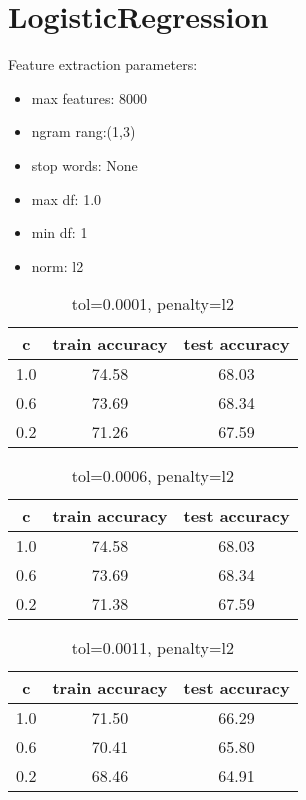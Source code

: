 \documentclass[a4paper,10pt]{article}
\begin{document}
\section{LogisticRegression}
\par Feature extraction parameters:
\begin{itemize}
\item max features: 8000
\item ngram rang:(1,3)
\item stop words: None
\item max df: 1.0
\item min df: 1
\item norm: l2
\end{itemize}

\begin{table}[!h]
\centering
\begin{tabular}{|c|c|c|}
\hline
c&train accuracy&test accuracy\\
\hline
1.0&74.58&68.03\\
\hline
0.6&73.69&68.34\\
\hline
0.2&71.26&67.59\\
\hline

\end{tabular}
\caption{tol=0.0001, penalty=l2}
\end{table}

\begin{table}[!h]
\centering
\begin{tabular}{|c|c|c|}
\hline
c&train accuracy&test accuracy\\
\hline
1.0&74.58&68.03\\
\hline
0.6&73.69&68.34\\
\hline
0.2&71.38&67.59\\
\hline

\end{tabular}
\caption{tol=0.0006, penalty=l2}
\end{table}

\begin{table}[!h]
\centering
\begin{tabular}{|c|c|c|}
\hline
c&train accuracy&test accuracy\\
\hline
1.0&71.50&66.29\\
\hline
0.6&70.41&65.80\\
\hline
0.2&68.46&64.91\\
\hline

\end{tabular}
\caption{tol=0.0011, penalty=l2}
\end{table}
\end{document}
